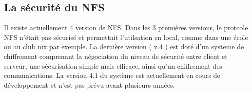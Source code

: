 \subsection{La sécurité du NFS}

Il existe actuellement 4 version de NFS. Dans les 3 premières versions, le protcole NFS n'était pas sécurisé et permettait l'utilsation en local, comme dans une école ou au club nix par exemple. La dernière version ( v.4 ) est doté d'un systeme de chiffrement comprenant la négociation du niveau de sécurité entre client et serveur, une sécurisation simple mais efficace, ainsi qu'un chiffrement des communications.
La version 4.1 du système est actuellement en cours de développement et n'est pas prévu avant plusieurs années.
